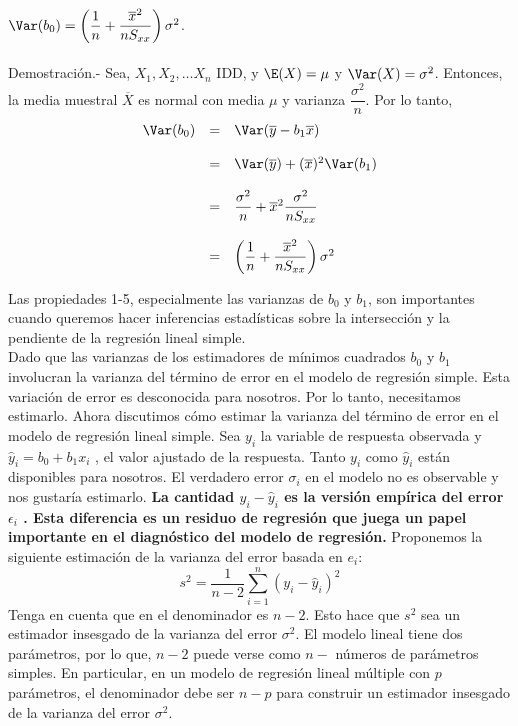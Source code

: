 \begin{teo}
    $\Var(b_0) = \left(\dfrac{1}{n}+\dfrac{\overline{x}^2}{nS_{xx}}\right)\sigma^2$.\\\\
    Demostración.-\; Sea, $X_1,X_2,\ldots X_n$ IDD, y  $\E(X)=\mu$ y $\Var(X)=\sigma^2$. Entonces, la media muestral $\overline{X}$ es normal con media $\mu$ y varianza $\dfrac{\sigma^2}{n}.$ Por lo tanto,
	$$
	\begin{array}{rcl}
	    \Var(b_0) &=& \Var(\overline{y}-b_1\overline{x})\\\\
		      &=& \Var(\overline{y})+(\overline{x})^2\Var(b_1)\\\\
		      &=& \dfrac{\sigma^2}{n}+ \overline{x}^2 \dfrac{\sigma^2}{nS_{xx}}\\\\
		      &=& \left(\dfrac{1}{n}+\dfrac{\overline{x}^2}{nS_{xx}}\right)\sigma^2
	\end{array}
	$$
\end{teo}

Las propiedades 1-5, especialmente las varianzas de $b_0$ y $b_1$, son importantes cuando queremos hacer inferencias estadísticas sobre la intersección y la pendiente de la regresión lineal simple.\\

Dado que las varianzas de los estimadores de mínimos cuadrados $b_0$ y $b_1$ involucran la varianza del término de error en el modelo de regresión simple. Esta variación de error es desconocida para nosotros. Por lo tanto, necesitamos estimarlo. Ahora discutimos cómo estimar la varianza del término de error en el modelo de regresión lineal simple. Sea $y_i$ la variable de respuesta observada y $\hat{y}_i=b_0+b_1x_i$ , el valor ajustado de la respuesta. Tanto $y_i$ como $\hat{y}_i$ están disponibles para nosotros. El verdadero error $\sigma_i$ en el modelo no es observable y nos gustaría estimarlo. \textbf{La cantidad \boldmath$y_i - \hat{y}_i$ es la versión empírica del error $\epsilon_i$ . Esta diferencia es un residuo de regresión que juega un papel importante en el diagnóstico del modelo de regresión.} Proponemos la siguiente estimación de la varianza del error basada en $e_i$:
$$s^2 = \dfrac{1}{n-2}\sum_{i=1}^n \left(y_i-\hat{y}_i\right)^2$$
Tenga en cuenta que en el denominador es $n-2$. Esto hace que $s^2$ sea un estimador insesgado de la varianza del error $\sigma^2$. El modelo lineal tiene dos parámetros, por lo que, $n-2$ puede verse como $n-$ números de parámetros simples. En particular, en un modelo de regresión lineal múltiple con $p$ parámetros, el denominador debe ser $n - p$ para construir un estimador insesgado de la varianza del error $\sigma^2$.\\

